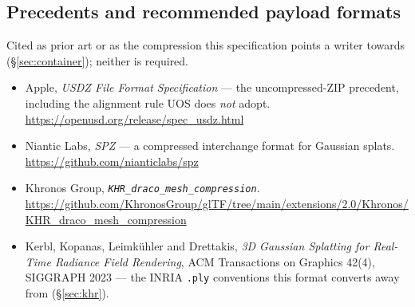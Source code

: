 \documentclass[11pt,a4paper]{article}
\newcommand{\code}[1]{\texttt{\small #1}}
\begin{document}
\subsection*{Precedents and recommended payload formats}
Cited as prior art or as the compression this specification points a writer towards
(\S\ref{sec:container}); neither is required.

\begin{itemize}
  \item Apple, \emph{USDZ File Format Specification} --- the uncompressed-ZIP precedent,
  including the alignment rule UOS does \emph{not} adopt.
  \url{https://openusd.org/release/spec_usdz.html}
  \item Niantic Labs, \emph{SPZ} --- a compressed interchange format for Gaussian splats.
  \url{https://github.com/nianticlabs/spz}
  \item Khronos Group, \emph{\code{KHR\_draco\_mesh\_compression}}.
  \url{https://github.com/KhronosGroup/glTF/tree/main/extensions/2.0/Khronos/KHR_draco_mesh_compression}
  \item Kerbl, Kopanas, Leimkühler and Drettakis, \emph{3D Gaussian Splatting for
  Real-Time Radiance Field Rendering}, ACM Transactions on Graphics 42(4), SIGGRAPH 2023
  --- the INRIA \code{.ply} conventions this format converts away from
  (\S\ref{sec:khr}).
\end{itemize}
\end{document}
